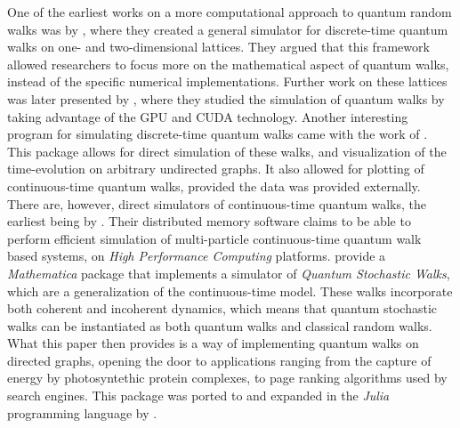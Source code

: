 \documentclass[../../dissertation.tex]{subfiles}
\begin{document}
One of the earliest works on a more computational approach to quantum random
walks was by \cite{marquezino2008}, where they created a general simulator for
discrete-time quantum walks on one- and two-dimensional lattices. They argued
that this framework allowed researchers to focus more on the mathematical
aspect of quantum walks, instead of the specific numerical implementations.
Further work on these lattices was later presented by \cite{sawerwain2010},
where they studied the simulation of quantum walks by taking advantage of the
GPU and CUDA technology. Another interesting program for simulating discrete-time
quantum walks came with the work of \cite{berry2011}. This package allows for
direct simulation of these walks, and visualization of the time-evolution on
arbitrary undirected graphs. It also allowed for plotting of continuous-time
quantum walks, provided the data was provided externally. 
There are, however, direct simulators of continuous-time quantum walks, the
earliest being by \cite{izaac2015}. Their distributed memory software claims to
be able to perform efficient simulation of multi-particle continuous-time
quantum walk based systems, on \textit{High Performance Computing} platforms.
\cite{falloon2017a} provide a \textit{Mathematica} package that implements a
simulator of \textit{Quantum Stochastic Walks}, which are a generalization of
the continuous-time model. These walks incorporate both coherent and incoherent
dynamics, which means that quantum stochastic walks can be instantiated as both
quantum walks and classical random walks. What this paper then provides is a
way of implementing quantum walks on directed graphs, opening the door to
applications ranging from the capture of energy by photosyntethic protein
complexes, to page ranking algorithms used by search engines. This package was
ported to and expanded in the \textit{Julia} programming language by
\cite{glos2018}.\par
\end{document}

